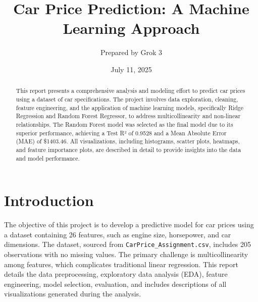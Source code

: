 \documentclass[12pt]{article}
\begin{document}
\title{\textbf{Car Price Prediction: A Machine Learning Approach}}
\author{Prepared by Grok 3}
\date{July 11, 2025}
\maketitle

\begin{abstract}
This report presents a comprehensive analysis and modeling effort to predict car prices using a dataset of car specifications. The project involves data exploration, cleaning, feature engineering, and the application of machine learning models, specifically Ridge Regression and Random Forest Regressor, to address multicollinearity and non-linear relationships. The Random Forest model was selected as the final model due to its superior performance, achieving a Test R² of 0.9528 and a Mean Absolute Error (MAE) of \$1403.46. All visualizations, including histograms, scatter plots, heatmaps, and feature importance plots, are described in detail to provide insights into the data and model performance.
\end{abstract}

\section{Introduction}
The objective of this project is to develop a predictive model for car prices using a dataset containing 26 features, such as engine size, horsepower, and car dimensions. The dataset, sourced from \texttt{CarPrice\_Assignment.csv}, includes 205 observations with no missing values. The primary challenge is multicollinearity among features, which complicates traditional linear regression. This report details the data preprocessing, exploratory data analysis (EDA), feature engineering, model selection, evaluation, and includes descriptions of all visualizations generated during the analysis.
\end{document}
